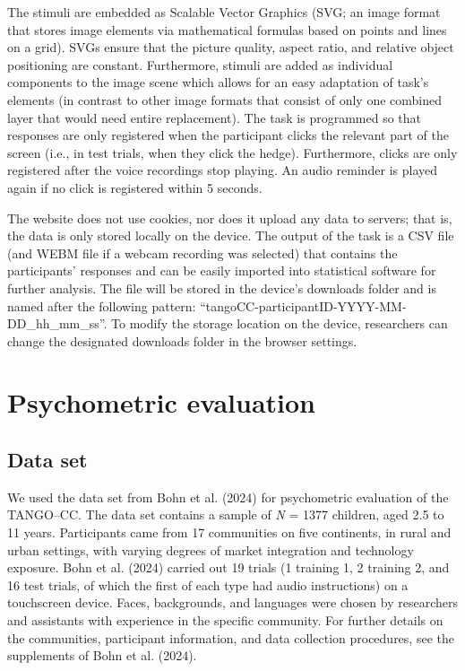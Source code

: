 \documentclass[
  man,floatsintext]{apa7}
\begin{document}
The stimuli are embedded as Scalable Vector Graphics (SVG; an image format that stores image elements via mathematical formulas based on points and lines on a grid).
SVGs ensure that the picture quality, aspect ratio, and relative object positioning are constant. Furthermore, stimuli are added as individual components to the image scene which allows for an easy adaptation of task's elements (in contrast to other image formats that consist of only one combined layer that would need entire replacement).
The task is programmed so that responses are only registered when the participant clicks the relevant part of the screen (i.e., in test trials, when they click the hedge).
Furthermore, clicks are only registered after the voice recordings stop playing.
An audio reminder is played again if no click is registered within 5 seconds.

The website does not use cookies, nor does it upload any data to servers; that is, the data is only stored locally on the device.
The output of the task is a CSV file (and WEBM file if a webcam recording was selected) that contains the participants' responses and can be easily imported into statistical software for further analysis.
The file will be stored in the device's downloads folder and is named after the following pattern: ``tangoCC-participantID-YYYY-MM-DD\_hh\_mm\_ss''. To modify the storage location on the device, researchers can change the designated downloads folder in the browser settings.

\section{Psychometric evaluation}\label{psychometric-evaluation}

\subsection{Data set}\label{data-set}

We used the data set from Bohn et al. (2024) for psychometric evaluation of the TANGO--CC.
The data set contains a sample of \emph{N} = 1377 children, aged 2.5 to 11 years.
Participants came from 17 communities on five continents, in rural and urban settings, with varying degrees of market integration and technology exposure.
Bohn et al. (2024) carried out 19 trials (1 training 1, 2 training 2, and 16 test trials, of which the first of each type had audio instructions) on a touchscreen device.
Faces, backgrounds, and languages were chosen by researchers and assistants with experience in the specific community.
For further details on the communities, participant information, and data collection procedures, see the supplements of Bohn et al. (2024).
\end{document}
